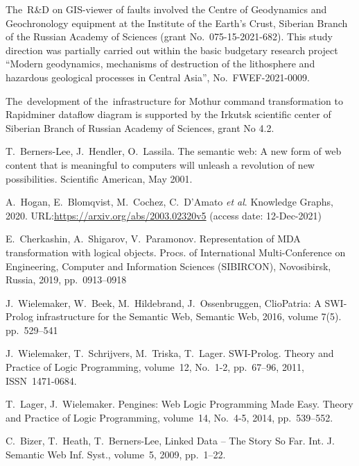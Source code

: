 \documentclass[a4paper]{jctart19a}
\begin{document}
The~R\&D on GIS-viewer of faults involved the Centre of Geodynamics and Geochronology equipment at the Institute of the Earth's Crust, Siberian Branch of the Russian Academy of Sciences (grant No.~075-15-2021-682).   This study direction was partially carried out within the basic budgetary research project ``Modern geodynamics, mechanisms of destruction of the lithosphere and hazardous geological processes in Central Asia'', No.~FWEF-2021-0009.

The~development of the~infrastructure for Mothur command transformation to Rapidminer dataflow diagram is supported by the Irkutsk scientific center of Siberian Branch of Russian Academy of Sciences, grant No 4.2.


% 

\begin{thebibliography}{99}

 T.~Berners-Lee, J.~Hendler, O.~Lassila.  The semantic web: A new form of web content that is meaningful to computers will unleash a revolution of new possibilities.  Scientific American, May 2001.

 A.~Hogan, E.~Blomqvist, M.~Cochez, C.~D’Amato \emph{et al}. Knowledge Graphs, 2020. URL:\url{https://arxiv.org/abs/2003.02320v5} (access date: 12-Dec-2021)

 E.~Cherkashin, A.~Shigarov, V.~Paramonov. Representation of MDA transformation with logical objects.  Procs. of International Multi-Conference on Engineering, Computer and Information Sciences (SIBIRCON), Novosibirsk, Russia, 2019, pp.~0913--0918 

 J.~Wielemaker, W.~Beek, M.~Hildebrand, J.~Ossenbruggen, ClioPatria: A SWI-Prolog infrastructure for the Semantic Web, Semantic Web, 2016, volume 7(5). pp.~529--541 

 J.~Wielemaker, T.~Schrijvers, M.~Triska, T.~Lager. SWI-Prolog. Theory and Practice of Logic Programming, volume~12, No.~1-2, pp.~67--96, 2011, ISSN~1471-0684.

 T.~Lager, J.~Wielemaker. Pengines: Web Logic Programming Made Easy.  Theory and Practice of Logic Programming, volume~14, No.~4-5, 2014, pp.~539--552. 

 C.~Bizer, T.~Heath, T.~Berners-Lee, Linked Data -- The Story So Far.  Int. J. Semantic Web Inf. Syst., volume~5, 2009, pp.~1--22. 


\end{thebibliography}
\end{document}
